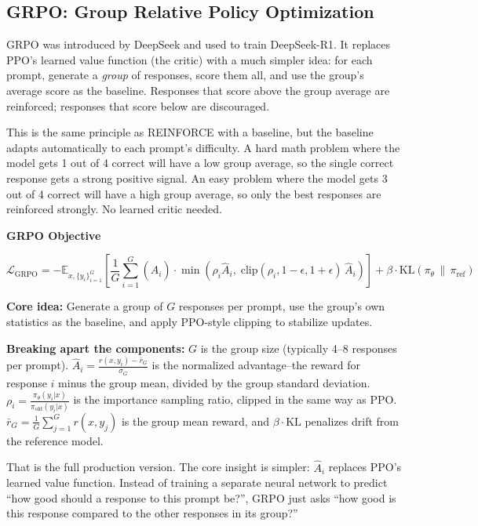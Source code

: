 \begin{chapterenv}
\section{GRPO: Group Relative Policy Optimization}

GRPO was introduced by DeepSeek and used to train DeepSeek-R1. It replaces PPO's learned value function (the critic) with a much simpler idea: for each prompt, generate a \textit{group} of responses, score them all, and use the group's average score as the baseline. Responses that score above the group average are reinforced; responses that score below are discouraged.

This is the same principle as REINFORCE with a baseline, but the baseline adapts automatically to each prompt's difficulty. A hard math problem where the model gets 1 out of 4 correct will have a low group average, so the single correct response gets a strong positive signal. An easy problem where the model gets 3 out of 4 correct will have a high group average, so only the best responses are reinforced strongly. No learned critic needed.

\begin{infobox}
\textbf{GRPO Objective}

$$\mathcal{L}_{\text{GRPO}} = -\mathbb{E}_{x,\{y_i\}_{i=1}^G}\!\left[\frac{1}{G}\sum_{i=1}^{G}\left(\hat{A}_i\right) \cdot \min\!\left(\rho_i \hat{A}_i,\; \text{clip}(\rho_i, 1{-}\epsilon, 1{+}\epsilon)\,\hat{A}_i\right)\right] + \beta \cdot \text{KL}(\pi_\theta \,\|\, \pi_{\text{ref}})$$

\textbf{Core idea:} Generate a group of $G$ responses per prompt, use the group's own statistics as the baseline, and apply PPO-style clipping to stabilize updates.
\end{infobox}

\textbf{Breaking apart the components:} $G$ is the group size (typically 4--8 responses per prompt). $\hat{A}_i = \frac{r(x, y_i) - \bar{r}_G}{\sigma_G}$ is the normalized advantage--the reward for response $i$ minus the group mean, divided by the group standard deviation. $\rho_i = \frac{\pi_\theta(y_i|x)}{\pi_{\text{old}}(y_i|x)}$ is the importance sampling ratio, clipped in the same way as PPO. $\bar{r}_G = \frac{1}{G}\sum_{j=1}^{G}r(x, y_j)$ is the group mean reward, and $\beta \cdot \text{KL}$ penalizes drift from the reference model.

That is the full production version. The core insight is simpler: $\hat{A}_i$ replaces PPO's learned value function. Instead of training a separate neural network to predict ``how good should a response to this prompt be?'', GRPO just asks ``how good is this response compared to the other responses in its group?''


\end{chapterenv}
